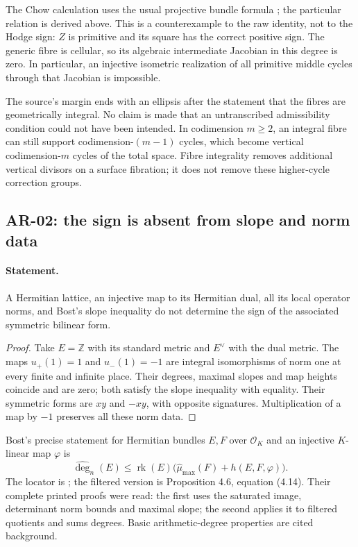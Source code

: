 The Chow calculation uses the usual projective bundle formula
\cite[Theorem 3.3(b)]{Fulton}; the particular relation is derived above.
This is a counterexample to the raw identity, not to the Hodge sign:
$Z$ is primitive and its square has the correct positive sign.  The generic
fibre is cellular, so its algebraic intermediate Jacobian in this degree
is zero.  In particular, an injective isometric realization of all primitive
middle cycles through that Jacobian is impossible.

The source's margin ends with an ellipsis after the statement that the
fibres are geometrically integral.  No claim is made that an untranscribed
admissibility condition could not have been intended.  In codimension
$m\ge2$, an integral fibre can still support codimension-$(m-1)$ cycles,
which become vertical codimension-$m$ cycles of the total space.  Fibre
integrality removes additional vertical divisors on a surface fibration;
it does not remove these higher-cycle correction groups.

\subsection{AR-02: the sign is absent from slope and norm data}
\label{ar:slope-sign}

\paragraph{Statement.}
A Hermitian lattice, an injective map to its Hermitian dual, all its local
operator norms, and Bost's slope inequality do not determine the sign of
the associated symmetric bilinear form.

\begin{proof}
Take $E=\mathbb Z$ with its standard metric and $E^\vee$ with the dual
metric.  The maps $u_+(1)=1$ and $u_-(1)=-1$ are integral isomorphisms of
norm one at every finite and infinite place.  Their degrees, maximal slopes
and map heights coincide and are zero; both satisfy the slope inequality
with equality.  Their symmetric forms are $xy$ and $-xy$, with opposite
signatures.  Multiplication of a map by $-1$ preserves all these norm data.
\end{proof}

Bost's precise statement for Hermitian bundles $E,F$ over $\mathcal O_K$
and an injective $K$-linear map $\varphi$ is
\[
 \widehat{\deg}_{n}(E)
 \leq\operatorname{rk}(E)
       \bigl(\widehat\mu_{\max}(F)+h(E,F,\varphi)\bigr).
\]
The locator is \cite[\S4.1.4, Proposition 4.5, equation (4.11)]{Bost};
the filtered version is Proposition 4.6, equation (4.14).  Their complete
printed proofs were read: the first uses the saturated image, determinant
norm bounds and maximal slope; the second applies it to filtered quotients
and sums degrees.  Basic arithmetic-degree properties are cited background.

